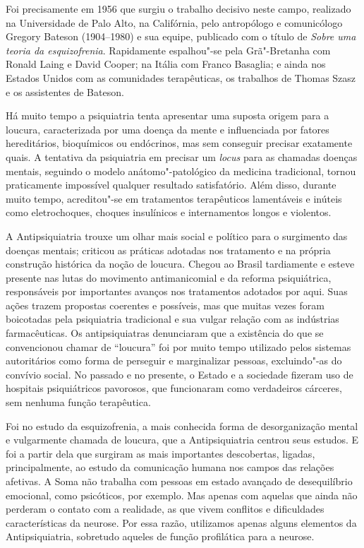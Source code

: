 Foi precisamente em 1956 que surgiu o trabalho decisivo neste campo,
realizado na Universidade de Palo Alto, na Califórnia, pelo antropólogo
e comunicólogo Gregory Bateson (1904--1980) e sua equipe, publicado com o
título de \emph{Sobre uma teoria da esquizofrenia}. Rapidamente
espalhou"-se pela Grã"-Bretanha com Ronald Laing e David Cooper; na
Itália com Franco Basaglia; e ainda nos Estados Unidos com as
comunidades terapêuticas, os trabalhos de Thomas Szasz e os assistentes
de Bateson.

Há muito tempo a psiquiatria tenta apresentar uma suposta origem para a
loucura, caracterizada por uma doença da mente e influenciada por
fatores hereditários, bioquímicos ou endócrinos, mas sem conseguir
precisar exatamente quais. A tentativa da psiquiatria em precisar um
\emph{locus} para as chamadas doenças mentais, seguindo o modelo
anátomo"-patológico da medicina tradicional, tornou praticamente
impossível qualquer resultado satisfatório. Além disso, durante muito
tempo, acreditou"-se em tratamentos terapêuticos lamentáveis e inúteis
como eletrochoques, choques insulínicos e internamentos longos e
violentos.

A Antipsiquiatria trouxe um olhar mais social e político para o
surgimento das doenças mentais; criticou as práticas adotadas nos
tratamento e na própria construção histórica da noção de loucura. Chegou
ao Brasil tardiamente e esteve presente nas lutas do movimento
antimanicomial e da reforma psiquiátrica, responsáveis por importantes
avanços nos tratamentos adotados por aqui. Suas ações trazem propostas
coerentes e possíveis, mas que muitas vezes foram boicotadas pela
psiquiatria tradicional e sua vulgar relação com as indústrias
farmacêuticas. Os antipsiquiatras denunciaram que a existência do que se
convencionou chamar de ``loucura'' foi por muito tempo utilizado pelos
sistemas autoritários como forma de perseguir e marginalizar pessoas,
excluindo"-as do convívio social. No passado e no presente, o Estado e a
sociedade fizeram uso de hospitais psiquiátricos pavorosos, que
funcionaram como verdadeiros cárceres, sem nenhuma função terapêutica.

Foi no estudo da esquizofrenia, a mais conhecida forma de desorganização
mental e vulgarmente chamada de loucura, que a Antipsiquiatria centrou
seus estudos. E foi a partir dela que surgiram as mais importantes
descobertas, ligadas, principalmente, ao estudo da comunicação humana
nos campos das relações afetivas. A Soma não trabalha com pessoas em
estado avançado de desequilíbrio emocional, como psicóticos, por
exemplo. Mas apenas com aquelas que ainda não perderam o contato com a
realidade, as que vivem conflitos e dificuldades características da
neurose. Por essa razão, utilizamos apenas alguns elementos da
Antipsiquiatria, sobretudo aqueles de função profilática para a neurose.

